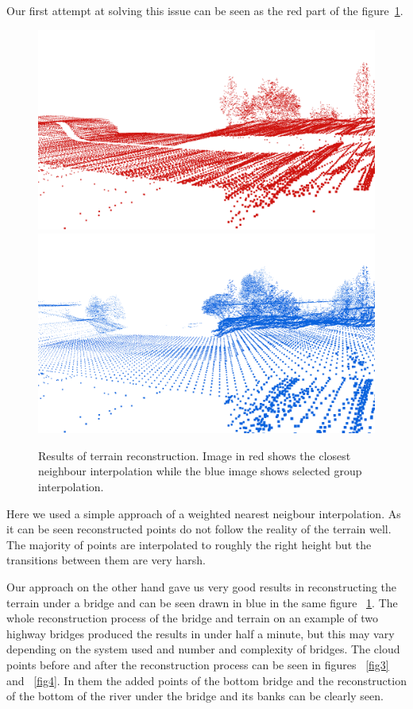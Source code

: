 \documentclass{egpubl-eurovis-star}
\begin{document}
Our first attempt at solving this issue can be seen as the red part of the figure~\ref{fig1}.
\begin{figure}[ht]
    \centering
    \includegraphics[width=1\columnwidth]{terrain_inter.png}
    \includegraphics[width=1\columnwidth]{terrain_br.png}
    \caption{Results of terrain reconstruction. Image in red shows the closest neighbour interpolation while the blue image shows selected group interpolation.}
    \label{fig1}
\end{figure}

Here we used a simple approach of a weighted nearest neigbour interpolation. 
As it can be seen reconstructed points do not follow the reality of the terrain well.
The majority of points are interpolated to roughly the right height but the transitions between them are very harsh.

Our approach on the other hand gave us very good results in reconstructing the terrain under a bridge and can be seen drawn in blue in the same figure ~\ref{fig1}.
The whole reconstruction process of the bridge and terrain on an example of two highway bridges produced the results in under half a minute, but this may vary depending on the system used and number and complexity of bridges.
The cloud points before and after the reconstruction process can be seen in figures ~\ref{fig3} and ~\ref{fig4}.
In them the added points of the bottom bridge and the reconstruction of the bottom of the river under the bridge and its banks can be clearly seen.
\end{document}
